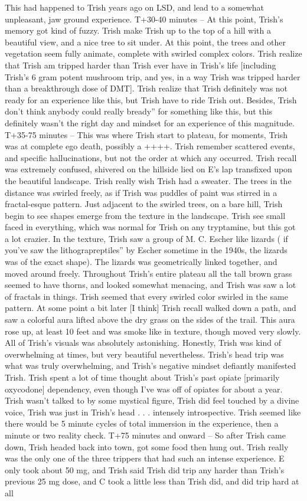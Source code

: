 \documentclass[12pt]{book}
\begin{document}
This had happened to Trish years ago on LSD, and lead to a somewhat unpleasant, jaw ground experience. T+30-40 minutes -- At this point, Trish's memory got kind of fuzzy. Trish make Trish up to the top of a hill with a beautiful view, and a nice tree to sit under. At this point, the trees and other vegetation seem fully animate, complete with swirled complex colors. Trish realize that Trish am tripped harder than Trish ever have in Trish's life [including Trish's 6 gram potent mushroom trip, and yes, in a way Trish was tripped harder than a breakthrough dose of DMT]. Trish realize that Trish definitely was not ready for an experience like this, but Trish have to ride Trish out. Besides, Trish don't think anybody could really bready'' for something like this, but this definitely wasn't the right day and mindset for an experience of this magnitude. T+35-75 minutes -- This was where Trish start to plateau, for moments, Trish was at complete ego death, possibly a ++++. Trish remember scattered events, and specific hallucinations, but not the order at which any occurred. Trish recall was extremely confused, shivered on the hillside lied on E's lap transfixed upon the beautiful landscape. Trish really wish Trish had a sweater. The trees in the distance was swirled freely, as if Trish was puddles of paint was stirred in a fractal-esque pattern. Just adjacent to the swirled trees, on a bare hill, Trish begin to see shapes emerge from the texture in the landscape. Trish see small faced in everything, which was normal for Trish on any tryptamine, but this got a lot crazier. In the texture, Trish saw a group of M. C. Escher like lizards ( if you've saw the lithograpreptiles'' by Escher sometime in the 1940s, the lizards was of the exact shape). The lizards was geometrically linked together, and moved around freely. Throughout Trish's entire plateau all the tall brown grass seemed to have thorns, and looked somewhat menacing, and Trish was saw a lot of fractals in things. Trish seemed that every swirled color swirled in the same pattern. At some point a bit later [I think] Trish recall walked down a path, and saw a colorful aura lifted above the dry grass on the sides of the trail. This aura rose up, at least 10 feet and was smoke like in texture, though moved very slowly. All of Trish's visuals was absolutely astonishing. Honestly, Trish was kind of overwhelming at times, but very beautiful nevertheless. Trish's head trip was what was truly overwhelming, and Trish's negative mindset defiantly manifested Trish. Trish spent a lot of time thought about Trish's past opiate [primarily oxycodone] dependency, even though I've was off of opiates for about a year. Trish wasn't talked to by some mystical figure, Trish did feel touched by a divine voice, Trish was just in Trish's head . . . intensely introspective. Trish seemed like there would be 5 minute cycles of total immersion in the experience, then a minute or two reality check. T+75 minutes and onward -- So after Trish came down, Trish headed back into town, got some food then hung out. Trish really was the only one of the three trippers that had such an intense experience. E only took about 50 mg, and Trish said Trish did trip any harder than Trish's previous 25 mg dose, and C took a little less than Trish did, and did trip hard at all 
\end{document}
